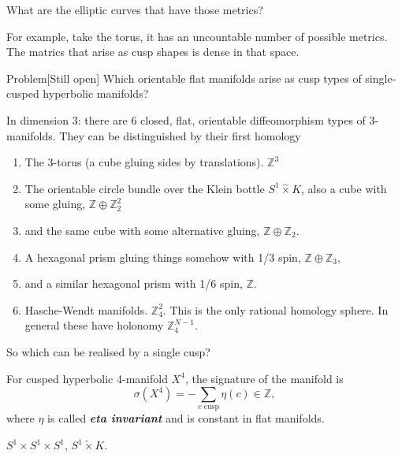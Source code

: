 \begin{question}[Misha]\leavevmode
What are the elliptic curves that have those metrics?
\end{question}

\begin{remark}\leavevmode
	For example, take the torus, it has an uncountable number of possible metrics. The matrics that arise as cusp shapes is dense in that space.
\end{remark}

\begin{thing4}{Problem}[Still open]\leavevmode
	Which orientable flat manifolds arise as cusp types of single-cusped hyperbolic manifolds?
\end{thing4}

In dimension 3: there are 6 closed, flat, orientable diffeomorphism types of 3-manifolds. They can be distinguished by their first homology
\begin{enumerate}
\item The 3-torus (a cube gluing sides by translations). $\mathbb{Z}^3$
\item The orientable circle bundle over the Klein bottle $S^1\overset{\sim}{\times}K$, also a cube with some gluing, $\mathbb{Z}\oplus  \mathbb{Z}^2_2$
\item  and the same cube with some alternative gluing, $\mathbb{Z} \oplus  \mathbb{Z}_2$.
\item A hexagonal prism gluing things somehow with 1/3 spin, $\mathbb{Z}\oplus \mathbb{Z}_3$,
\item and a similar hexagonal prism with 1/6 spin, $\mathbb{Z}$.
\item  Hasche-Wendt manifolds. $\mathbb{Z}^2_4$. This is the only rational homology sphere. In general these have holonomy $\mathbb{Z}_4^{N-1}$.
\end{enumerate}

So which can be realised by a single cusp?

\begin{thm}\leavevmode
For cusped hyperbolic 4-manifold $X^4$, the signature of the manifold is
\[\sigma(X^4)=-\sum_{c \text{ cusp} }\eta(c)\in\mathbb{Z},\]
where $\eta$ is called \textit{\textbf{eta invariant}} and is constant in flat manifolds.
\end{thm}

\begin{thm}\leavevmode
$S^1 \times S^1\times S^1$, $S^1\tilde{\times}K$.
\end{thm}

